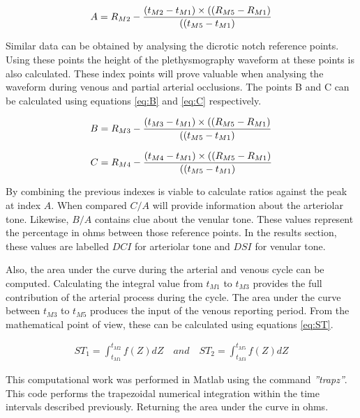 \begin{align}
	\label{eq:A}
	A = R_{M2} - \frac{(t_{M2}-t_{M1}) \times ((R_{M5}-R_{M1})}{((t_{M5}-t_{M1})} \tagaddtext{[\si{\ohm}]}
\end{align}

Similar data can be obtained by analysing the dicrotic notch reference points. Using these points the height of the plethysmography waveform at these points is also calculated. These index points will prove valuable when analysing the waveform during venous and partial arterial occlusions. The points B and C can be calculated using equations \ref{eq:B} and \ref{eq:C} respectively.  

\begin{align}
	\label{eq:B}
	B = R_{M3} - \frac{(t_{M3}-t_{M1}) \times ((R_{M5}-R_{M1})}{((t_{M5}-t_{M1})} \tagaddtext{[\si{\ohm}]}
\end{align}

\begin{align}
	\label{eq:C}
	C = R_{M4} - \frac{(t_{M4}-t_{M1}) \times ((R_{M5}-R_{M1})}{((t_{M5}-t_{M1})} \tagaddtext{[\si{\ohm}]}
\end{align}

By combining the previous indexes is viable to calculate ratios against the peak at index $A$. When compared $C/A$ will provide information about the arteriolar tone. Likewise, $B/A$ contains clue about the venular tone. These values represent the percentage in ohms between those reference points. In the results section, these values are labelled $DCI$ for arteriolar tone and $DSI$ for venular tone.


Also, the area under the curve during the arterial and venous cycle can be computed. Calculating the integral value from $t_{M1}$ to $t_{M3}$ provides the full contribution of the arterial process during the cycle. The area under the curve between $t_{M3}$ to $t_{M5}$ produces the input of the venous reporting period. From the mathematical point of view, these can be calculated using equations \ref{eq:ST}.

\begin{align}
	\label{eq:ST}
	ST_1 = \int_{t_{M1}}^{t_{M2}} f(Z) dZ \quad and \quad ST_2 = \int_{t_{M3}}^{t_{M5}} f(Z) dZ 
\end{align}

This computational work was performed in Matlab using the command \textit{''trapz''}. This code performs the trapezoidal numerical integration within the time intervals described previously. Returning the area under the curve in ohms.



